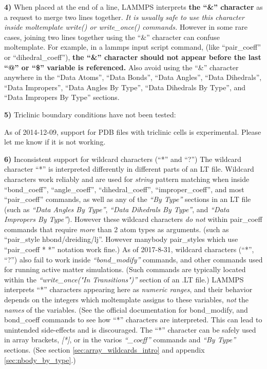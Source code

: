 \documentclass[11pt]{article}
\begin{document}
\textbf{4)} 
When placed at the end of a line, LAMMPS interprets 
\textbf{the ``\&'' character} as a 
request to merge two lines together.
\textit{It is usually safe to use this character inside
moltemplate write() or write\_once() commands.}
However in some rare cases, joining two lines together using 
the ``\&'' character can confuse moltemplate. 
For example, in a lammps input script command, 
(like ``pair\_coeff'' or ``dihedral\_coeff''), 
\textbf{the ``\&'' character should not appear before 
the last ``@'' or ``\$'' variable is referenced.}
Also avoid using the ``\&'' character anywhere in the 
``Data Atoms'', ``Data Bonds'', ``Data Angles'', ``Data Dihedrals'', ``Data Impropers'', ``Data Angles By Type'', ``Data Dihedrals By Type'', and ``Data Impropers By Type''
sections.

\textbf{5)} Triclinic boundary conditions have not been tested:

As of 2014-12-09, support for PDB files with triclinic cells is experimental.
Please let me know if it is not working.

\textbf{6)} Inconsistent support for wildcard characters (``*'' and ``?'') 
\label{sec:wildcard_bug}
   The wildcard character ``*''
   is interpreted differently in different parts of an LT file.
   Wildcard characters work reliably and are used for \textit{string}
   pattern matching when inside
   ``bond\_coeff'', ``angle\_coeff'', ``dihedral\_coeff'', ``improper\_coeff'',
   and most ``pair\_coeff'' commands,
   as well as any of the \textit{``By Type''} sections 
   in an LT file (such as
   \textit{``Data Angles By Type''}, 
   \textit{``Data Dihedrals By Type''}, and 
   \textit{``Data Impropers By Type''}).
   However these wildcard characters \textit{do not}
   within pair\_coeff commands that require \textit{more}
   than 2 atom types as arguments.
   (such as ``pair\_style hbond/dreiding/lj''.
    However manybody pair\_styles which use ``pair\_coeff * *''
    notation work fine.)
   As of 2017-8-31, wildcard characters (``*'', ``?'') also fail to work inside
   \textit{``bond\_modify''} commands, and other commands used for running
   active matter simulations. (Such commands are typically located within the
   \textit{``write\_once("In Transitions")''} section of an .LT file.)
   LAMMPS interprets ``*'' characters appearing here as
   \textit{numeric ranges}, and their behavior depends on the
   integers which moltemplate assigns to these variables,
   \textit{not} the \textit{names} of the variables.
   (See the official documentation for bond\_modify, and bond\_coeff
    commands to see how ``*'' characters are interpreted.
   This can lead to unintended side-effects and is discouraged.
   The ``*'' character can be safely used in array brackets, \textit{[*]}, or in
   the varios \textit{``\_coeff''} commands and \textit{``By Type''} sections.
   (See section \ref{sec:array_wildcards_intro} 
    and appendix \ref{sec:nbody_by_type}.)
\end{document}
